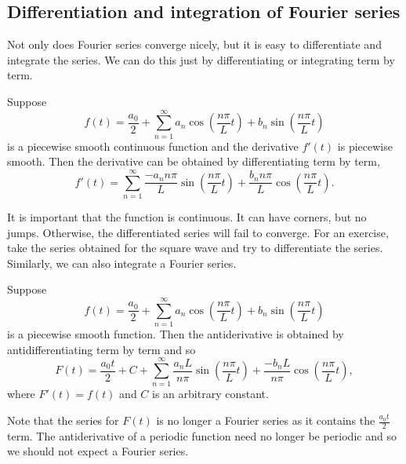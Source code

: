 \documentclass{ximera}
\begin{document}
\subsection{Differentiation and integration of Fourier series}

Not only does Fourier series converge nicely, but it is easy to differentiate and integrate the series.  We can do this just by differentiating or integrating term by term.

\begin{theorem}{}
    Suppose
    \begin{equation*}
        f(t) = \frac{a_0}{2} + \sum_{n=1}^\infty a_n \cos \left( \frac{n \pi}{L} t \right) + b_n \sin \left( \frac{n \pi}{L} t \right)
    \end{equation*}
    is a piecewise smooth continuous function and the derivative $f'(t)$ is piecewise smooth.  Then the derivative can be obtained by differentiating term by term,
    \begin{equation*}
        f'(t) = \sum_{n=1}^\infty \frac{-a_n n \pi}{L}  \sin \left( \frac{n \pi}{L} t \right) + \frac{b_n n \pi}{L} \cos \left( \frac{n \pi}{L} t \right) .
    \end{equation*}
\end{theorem}

It is important that the function is continuous.  It can have corners, but no jumps.  Otherwise, the differentiated series will fail to converge.  For an exercise, take the series obtained for the square wave and try to differentiate the series.  Similarly, we can also integrate a Fourier series.

\begin{theorem}{}
    Suppose
    \begin{equation*}
        f(t) = \frac{a_0}{2} + \sum_{n=1}^\infty a_n \cos \left( \frac{n \pi}{L} t \right) + b_n \sin \left( \frac{n \pi}{L} t \right)
    \end{equation*}
    is a piecewise smooth function.  Then the antiderivative is obtained by antidifferentiating term by term and so
    \begin{equation*}
        F(t) = \frac{a_0 t}{2} + C + \sum_{n=1}^\infty \frac{a_n L}{n \pi} \sin \left( \frac{n \pi}{L} t \right) + \frac{-b_n L}{n \pi}  \cos \left( \frac{n \pi}{L} t \right) ,
    \end{equation*}
    where $F'(t) = f(t)$ and $C$ is an arbitrary constant.
\end{theorem}

Note that the series for $F(t)$ is no longer a Fourier series as it contains the $\frac{a_0 t}{2}$ term.  The antiderivative of a periodic function need no longer be periodic and so we should not expect a Fourier series.
\end{document}
